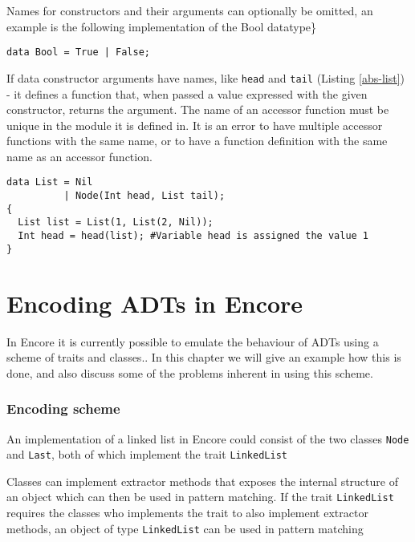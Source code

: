\documentclass[10pt]{report}
\def\code#1{\texttt{#1}} %
\begin{document}
\par{Names for constructors and their arguments can optionally be omitted, an example is the following implementation of the Bool datatype\}

\begin{lstlisting}[language=encore,caption={Actual definition of built-in type Bool},label=test-kiko]
data Bool = True | False;
\end{lstlisting}

\par{If data constructor arguments have names, like \code{head} and \code{tail} (Listing \ref{abs-list}) - it defines a function that, when passed a value expressed with the given constructor, returns the argument.  The name of an accessor function must be unique in the module it is defined in. It is an error to have multiple accessor functions with the same name, or to have a function definition with the same name as an accessor function.}

\begin{lstlisting}[language=encore,caption={Accessor funtion in ABS},label=abs-list]
data List = Nil
          | Node(Int head, List tail);
{
  List list = List(1, List(2, Nil));
  Int head = head(list); #Variable head is assigned the value 1
}
\end{lstlisting}

\chapter{Encoding ADTs in Encore}
\par{In Encore it is currently possible to emulate the behaviour of ADTs using a scheme of traits and classes.\cite{gustavL}. In this chapter we will give an example how this is done, and also discuss some of the problems inherent in using this scheme.}
\subsection{Encoding scheme}
\par{An implementation of a linked list in Encore could consist of the two classes \code{Node} and \code{Last}, both of which implement the trait \code{LinkedList}}
\par{Classes can implement extractor methods that exposes the internal structure of an object which can then be used in pattern matching. If the trait \code{LinkedList} requires the classes who implements the trait to also implement extractor methods, an object of type \code{LinkedList} can be used in pattern matching}

}
\end{document}
